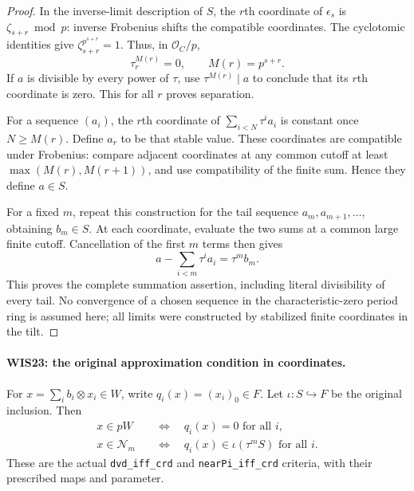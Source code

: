 \begin{proof}
In the inverse-limit description of $S$, the $r$th
coordinate of $\epsilon_s$ is
$\zeta_{s+r}\bmod p$: inverse Frobenius shifts the
compatible coordinates. The cyclotomic identities give
$\zeta_{s+r}^{p^{s+r}}=1$. Thus, in $\mathcal O_C/p$,
\[
                   \tau_r^{M(r)}=0,\qquad M(r)=p^{s+r}.
                                                               \tag{WIS.34}
\]
If $a$ is divisible by every power of $\tau$, use
$\tau^{M(r)}\mid a$ to conclude that its $r$th
coordinate is zero. This for all $r$ proves separation.

For a sequence $(a_i)$, the $r$th coordinate of
$\sum_{i<N}\tau^ia_i$ is constant once $N\geq M(r)$.
Define $a_r$ to be that stable value. These coordinates
are compatible under Frobenius: compare adjacent
coordinates at any common cutoff at least
$\max(M(r),M(r+1))$, and use compatibility of the
finite sum. Hence they define $a\in S$.

For a fixed $m$, repeat this construction for the tail
sequence $a_m,a_{m+1},\ldots$, obtaining $b_m\in S$.
At each coordinate, evaluate the two sums at a common
large finite cutoff. Cancellation of the first $m$
terms then gives
\[
                     a-\sum_{i<m}\tau^ia_i=\tau^m b_m.
 \tag{WIS.35}
\]
This proves the complete summation assertion, including
literal divisibility of every tail. No convergence of
a chosen sequence in the characteristic-zero period
ring is assumed here; all limits were constructed
by stabilized finite coordinates in the tilt.
\end{proof}

\paragraph{WIS23: the original approximation condition in coordinates.}
\label{claim:WIS23}
For $x=\sum_i b_i\otimes x_i\in W$, write
$q_i(x)=(x_i)_0\in F$. Let $\iota:S\hookrightarrow F$
be the original inclusion. Then
\[
 \begin{split}
 x\in pW&\quad\Longleftrightarrow\quad q_i(x)=0
                                      \text{ for all }i,\\
 x\in\mathcal N_m&\quad\Longleftrightarrow\quad
 q_i(x)\in\iota(\tau^mS)\text{ for all }i.
 \end{split}                                               \tag{WIS.36}
\]
These are the actual \texttt{dvd\_iff\_crd} and
\texttt{nearPi\_iff\_crd} criteria, with their prescribed
maps and parameter.

